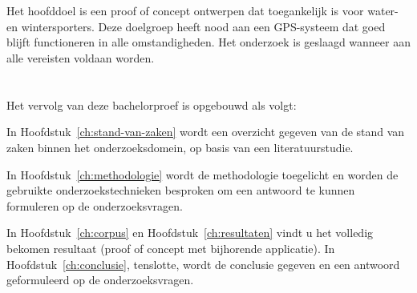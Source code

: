\section{}
\label{sec:onderzoeksdoelstelling}
Het hoofddoel is een proof of concept ontwerpen dat toegankelijk is voor water- en wintersporters. Deze doelgroep heeft nood aan een GPS-systeem dat goed blijft functioneren in alle omstandigheden. Het onderzoek is geslaagd wanneer aan alle vereisten voldaan worden.


\section{}
\label{sec:opzet-bachelorproef}


Het vervolg van deze bachelorproef is opgebouwd als volgt:

In Hoofdstuk~\ref{ch:stand-van-zaken} wordt een overzicht gegeven van de stand van zaken binnen het onderzoeksdomein, op basis van een literatuurstudie.

In Hoofdstuk~\ref{ch:methodologie} wordt de methodologie toegelicht en worden de gebruikte onderzoekstechnieken besproken om een antwoord te kunnen formuleren op de onderzoeksvragen.


In Hoofdstuk~\ref{ch:corpus} en Hoofdstuk~\ref{ch:resultaten} vindt u het volledig bekomen resultaat (proof of concept met bijhorende applicatie).
\newline
\newline
In Hoofdstuk~\ref{ch:conclusie}, tenslotte, wordt de conclusie gegeven en een antwoord geformuleerd op de onderzoeksvragen.